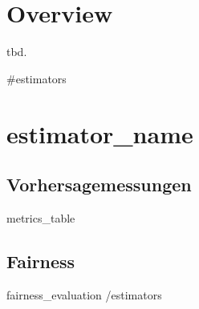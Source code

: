 \documentclass{article}
\begin{document}
\section{Overview}

tbd.

{{#estimators}}
\section{ {{estimator_name}} }

\subsection{Vorhersagemessungen}
{{{metrics_table}}}

\subsection{Fairness}
{{{fairness_evaluation}}}
{{/estimators}}
\end{document}
